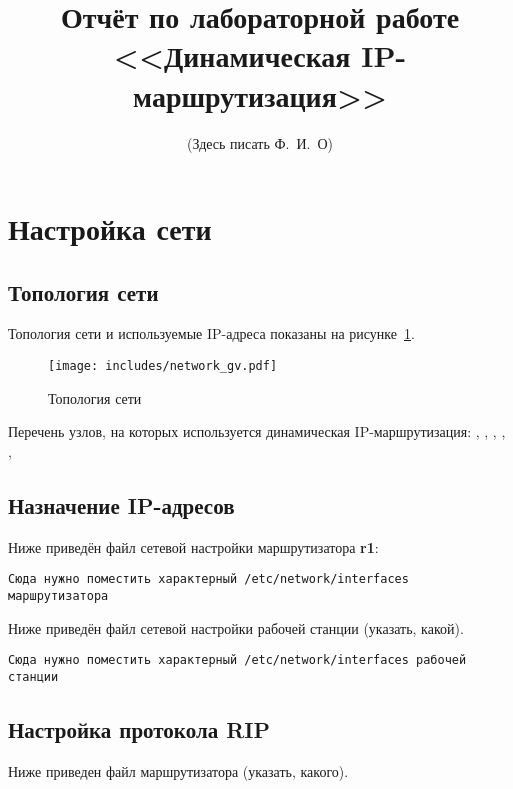 \documentclass[a4paper,12pt]{article}
\title{Отчёт по лабораторной работе \\ <<Динамическая IP-маршрутизация>>}
\author{(Здесь писать Ф.~И.~О)}
\begin{document}
\maketitle

\tableofcontents

\section{Настройка сети}

\subsection{Топология сети}

Топология сети и используемые IP-адреса показаны на рисунке~\ref{fig:network}.

\begin{figure}
\centering
\texttt{[image: includes/network\_gv.pdf]}
\caption{Топология сети}
\label{fig:network}
\end{figure}

Перечень узлов, на которых используется динамическая IP-маршрутизация: 
, , , , , 


\subsection{Назначение IP-адресов}

Ниже приведён файл сетевой настройки  маршрутизатора \textbf{r1}:

\begin{Verbatim}
Сюда нужно поместить характерный /etc/network/interfaces маршрутизатора
\end{Verbatim}

Ниже приведён файл сетевой настройки рабочей станции (указать, какой).

\begin{Verbatim}
Сюда нужно поместить характерный /etc/network/interfaces рабочей станции
\end{Verbatim}



\subsection{Настройка протокола RIP}

Ниже приведен файл  маршрутизатора (указать, какого).
\end{document}
